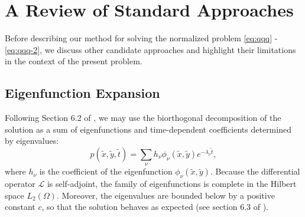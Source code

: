 \section{A Review of Standard Approaches}
Before describing our method for solving the normalized problem
\eqref{eq:qqq} - \eqref{eq:qqq-2}, we discuss other candidate
approaches and highlight their limitations in the context of the
present problem.

\subsection{Eigenfunction Expansion} \label{sec:eigenfunction}
Following Section 6.2 of \cite{risken1989fokker-planck}, we may use
the biorthogonal decomposition of the solution as a sum of
eigenfunctions and time-dependent coefficients determined by eigenvalues:
\begin{equation}
  p(\tilde{x},\tilde{y},\tilde{t}) =  \sum_\nu h_\nu \phi_\nu (\tilde{x}, \tilde{y}) e^{-\lambda_\nu \tilde{t}}, \label{eq:biorthogonal}
\end{equation}
where $h_\nu$ is the coefficient of the eigenfunction
$\phi_\nu(\tilde{x}, \tilde{y})$. Because the differential operator
$\mathcal{L}$ is self-adjoint, the family of eigenfunctions is
complete in the Hilbert space $L_2(\Omega)$. Moreover, the eigenvalues
are bounded below by a positive constant $c$, so that the solution
behaves as expected (see section 6.3 of
\cite{risken1989fokker-planck}).

